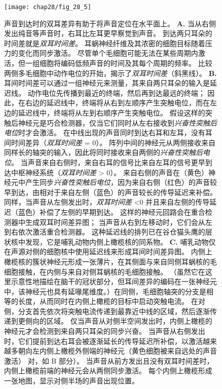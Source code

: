 \begin{figure}[htbp]
	\centering
	\texttt{[image: chap28/fig\_28\_5]}
	\caption{声音到达时的双耳差异有助于将声音定位在水平面上。
		\textbf{A.} 当从右侧发出纯音等声音时，右耳比左耳更早察觉到声音。 
		到达两只耳朵的时间差就是\textit{双耳时间差}。 
		耳蜗神经纤维及其浓密的细胞目标随着压力的变化而同步激活。
		尽管单个毛细胞可能无法在某些周期内激活，但一组细胞将编码低频声音的时间及其每个周期的频率。 
		比较两侧多毛细胞中动作电位的开始，揭示了\textit{双耳时间差}（斜黑线）。 
		\textbf{B.} 耳间时间差可以通过一组神经元来测量，其来自两只耳朵的输入是延迟线\cite{jeffress1948place}。
		动作电位先传播到最近的终端，然后再到达最远的终端；
		因此，在右边的延迟线中，终端将从右到左顺序产生突触电位，而在左边的延迟线中，终端将从左到右顺序产生突触电位。
		假设这样的突触后神经元是巧合检测器，仅当它们同时从左右接收到\textit{兴奋性突触后电位}时才会激活。
		在中线出现的声音同时到达右耳和左耳，没有耳间时间差异（\textit{双耳时间差} = 0）。
		阵列中间的神经元从两侧接收来自同样长的轴突的输入，因此将同时接收来自两侧的\textit{兴奋性突触后电位}。
		当声音来自右侧时，来自右耳的信号比来自左耳的信号更早到达中枢神经系统（\textit{双耳时间差} > 0）。
		来自右侧的声音在（黄色）神经元中产生同步\textit{兴奋性突触后电位}，因为来自右侧（红色）的声音较早到达，由相对于来自左侧（蓝色）的声音较长的传导延迟来补偿。
		同样，当声音从左侧发出时，\textit{双耳时间差} <0 并且来自左侧的传导延迟（蓝色）补偿了左侧的早期到达。
		这样的神经元回路会在重合检测器中生成双耳时间差异图；
		当声音从右到左移动时，它们会从左到右依次激活重合检测器。
		这种延迟线的排列已在谷仓猫头鹰的层状核中发现，它是哺乳动物内侧上橄榄核的同系物。
		\textbf{C.} 哺乳动物仅在声源对侧的细胞核中使用延迟线来形成耳间时间差异图。
		内侧上橄榄核的簇状神经元形成一张薄片，在其侧面与来自同侧耳蜗核的毛细胞接触，在内侧与来自对侧耳蜗核的毛细胞接触。 
		（虽然它在这里示意性地描绘在脑干的冠状部分，但耳间差异的编码在一张神经元中，该神经元也具有延喙尾维度。）在同侧，毛细胞轴突的分支是相等的长度，从而同时在内侧上橄榄的目标中启动突触电流。
		在对侧，分支首先依次将突触电流传递到最靠近中线的区域，然后逐渐传递到更侧向的区域。
		仅当声音从对侧半空间发出时，内侧上橄榄的神经元才会检测到来自两只耳朵的同步兴奋。
		当声音从右侧发出时，它们提前到达右耳会被逐渐延长的传导延迟所补偿，以激活越来越多朝向左内侧上橄榄外侧端的神经元（黄色细胞被来自远处的声音激活） 对，如 B 部分）。
		当声音从前方发出且没有双耳时间差时，内侧上橄榄前端的神经元会从两侧同步激活。
		每个内侧上橄榄形成一张地图，显示对侧半场的声音出现位置\cite{yin2002neural}。}
	\label{fig:28_5}
\end{figure}


